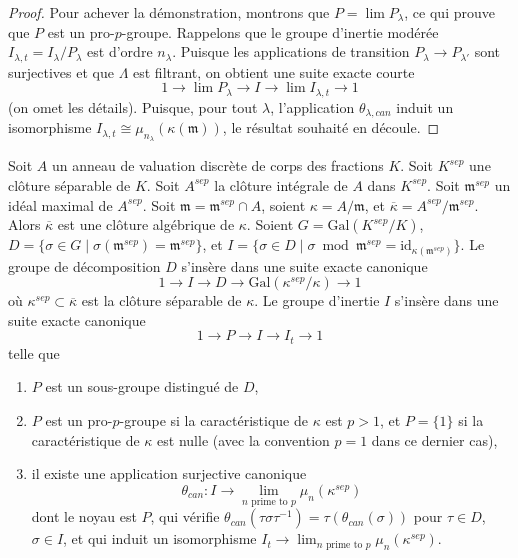 \begin{proof}
\medskip\noindent
Pour achever la démonstration, montrons que $P = \lim P_\lambda$, ce qui prouve
que $P$ est un pro-$p$-groupe. Rappelons que le groupe d'inertie modérée
$I_{\lambda, t} = I_\lambda/P_\lambda$ est d'ordre $n_\lambda$.
Puisque les applications de transition $P_\lambda \to P_{\lambda'}$ sont surjectives
et que $\Lambda$ est filtrant, on obtient une suite exacte courte
$$
1 \to \lim P_\lambda \to I \to \lim I_{\lambda, t} \to 1
$$
(on omet les détails). Puisque, pour tout $\lambda$, l'application $\theta_{\lambda, can}$
induit un isomorphisme
$I_{\lambda, t} \cong \mu_{n_\lambda}(\kappa(\mathfrak m))$,
le résultat souhaité en découle.
\end{proof}

\begin{lemma}
\label{lemma-structure-decomposition-separable-closure}
Soit $A$ un anneau de valuation discrète de corps des fractions $K$.
Soit $K^{sep}$ une clôture séparable de $K$.
Soit $A^{sep}$ la clôture intégrale de $A$ dans $K^{sep}$.
Soit $\mathfrak m^{sep}$ un idéal maximal de $A^{sep}$.
Soit $\mathfrak m = \mathfrak m^{sep} \cap A$, soient
$\kappa = A/\mathfrak m$, et
$\overline{\kappa} = A^{sep}/\mathfrak m^{sep}$.
Alors $\overline{\kappa}$ est une clôture algébrique de $\kappa$.
Soient $G = \text{Gal}(K^{sep}/K)$,
$D = \{\sigma \in G \mid \sigma(\mathfrak m^{sep}) = \mathfrak m^{sep}\}$, et
$I = \{\sigma \in D \mid \sigma \bmod \mathfrak m^{sep} =
\text{id}_{\kappa(\mathfrak m^{sep})}\}$.
Le groupe de décomposition $D$ s'insère dans une suite exacte canonique
$$
1 \to I \to D \to \text{Gal}(\kappa^{sep}/\kappa) \to 1
$$
où $\kappa^{sep} \subset \overline{\kappa}$ est la clôture
séparable de $\kappa$.
Le groupe d'inertie $I$ s'insère dans une suite exacte canonique
$$
1 \to P \to I \to I_t \to 1
$$
telle que
\begin{enumerate}
\item $P$ est un sous-groupe distingué de $D$,
\item $P$ est un pro-$p$-groupe si la caractéristique de
$\kappa$ est $p > 1$, et $P = \{1\}$ si la caractéristique de $\kappa$
est nulle (avec la convention $p = 1$ dans ce dernier cas),
\item il existe une application surjective canonique
$$
\theta_{can} : I \to \lim_{n\text{ prime to }p} \mu_n(\kappa^{sep})
$$
dont le noyau est $P$, qui vérifie
$\theta_{can}(\tau \sigma \tau^{-1}) = \tau(\theta_{can}(\sigma))$
pour $\tau \in D$, $\sigma \in I$, et qui induit un isomorphisme
$I_t \to \lim_{n\text{ prime to }p} \mu_n(\kappa^{sep})$.
\end{enumerate}
\end{lemma}


